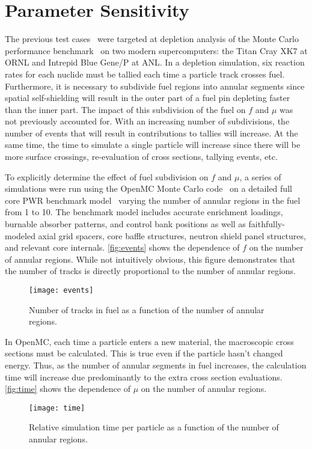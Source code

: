 \documentclass{snamc2013}
\begin{document}
\section{Parameter Sensitivity}

The previous test cases~\cite{jcp-romano-2013} were targeted at depletion
analysis of the Monte Carlo performance benchmark~\cite{mc2011-hoogenboom} on
two modern supercomputers: the Titan Cray XK7 at ORNL and Intrepid Blue Gene/P
at ANL. In a depletion simulation, six reaction rates for each nuclide must be
tallied each time a particle track crosses fuel. Furthermore, it is necessary to
subdivide fuel regions into annular segments since spatial self-shielding will
result in the outer part of a fuel pin depleting faster than the inner part. The
impact of this subdivision of the fuel on $f$ and $\mu$ was not previously
accounted for. With an increasing number of subdivisions, the number of events
that will result in contributions to tallies will increase. At the same time,
the time to simulate a single particle will increase since there will be more
surface crossings, re-evaluation of cross sections, tallying events, etc.

To explicitly determine the effect of fuel subdivision on $f$ and $\mu$, a
series of simulations were run using the OpenMC Monte Carlo
code~\cite{ane-romano-2013} on a detailed full core PWR benchmark
model~\cite{mc2013-horelik} varying the number of annular regions in the fuel
from 1 to 10. The benchmark model includes accurate enrichment loadings,
burnable absorber patterns, and control bank positions as well as
faithfully-modeled axial grid spacers, core baffle structures, neutron shield
panel structures, and relevant core internals. \autoref{fig:events} shows the
dependence of $f$ on the number of annular regions. While not intuitively
obvious, this figure demonstrates that the number of tracks is directly
proportional to the number of annular regions.
\begin{figure}[htb]
  \centering
  \texttt{[image: events]}
  \caption{Number of tracks in fuel as a function of the number of annular
    regions.}
  \label{fig:events}
\end{figure}

In OpenMC, each time a particle enters a new material, the macroscopic cross
sections must be calculated. This is true even if the particle hasn't changed
energy. Thus, as the number of annular segments in fuel increases, the
calculation time will increase due predominantly to the extra cross section
evaluations. \autoref{fig:time} shows the dependence of $\mu$ on the number of
annular regions.
\begin{figure}[b]
  \centering
  \texttt{[image: time]}
  \caption{Relative simulation time per particle as a function of the number of
    annular regions.}
  \label{fig:time}
\end{figure}
\end{document}
